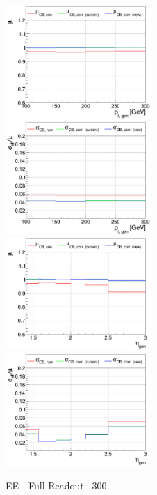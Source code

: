 \begin{figure}
\includegraphics[width=0.495\textwidth]{./plots_pdf/ECAL_plots/plotsPU/EE/FULL/pdf/GENPT/EEFULL_GENPT_0100_0300_MuOverBins.pdf}
\includegraphics[width=0.495\textwidth]{./plots_pdf/ECAL_plots/plotsPU/EE/FULL/pdf/GENPT/EEFULL_GENPT_0100_0300_EffSigmaOverBins.pdf}
\includegraphics[width=0.495\textwidth]{./plots_pdf/ECAL_plots/plotsPU/EE/FULL/pdf/GENETA/EEFULL_GENETA_0100_0300_MuOverBins.pdf}
\includegraphics[width=0.495\textwidth]{./plots_pdf/ECAL_plots/plotsPU/EE/FULL/pdf/GENETA/EEFULL_GENETA_0100_0300_EffSigmaOverBins.pdf}
\caption{EE - Full Readout --300\GeV.}
\end{figure}




